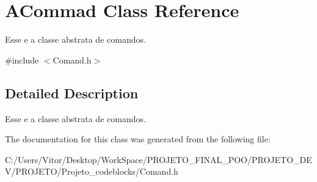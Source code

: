 \hypertarget{class_a_commad}{\section{A\-Commad Class Reference}
\label{class_a_commad}
}


Esse e a classe abstrata de comandos.  




{\ttfamily \#include $<$Comand.\-h$>$}



\subsection{Detailed Description}
Esse e a classe abstrata de comandos. 

The documentation for this class was generated from the following file\-:\begin{DoxyCompactItemize}
\item 
C\-:/\-Users/\-Vitor/\-Desktop/\-Work\-Space/\-P\-R\-O\-J\-E\-T\-O\-\_\-\-F\-I\-N\-A\-L\-\_\-\-P\-O\-O/\-P\-R\-O\-J\-E\-T\-O\-\_\-\-D\-E\-V/\-P\-R\-O\-J\-E\-T\-O/\-Projeto\-\_\-codeblocks/Comand.\-h\end{DoxyCompactItemize}
